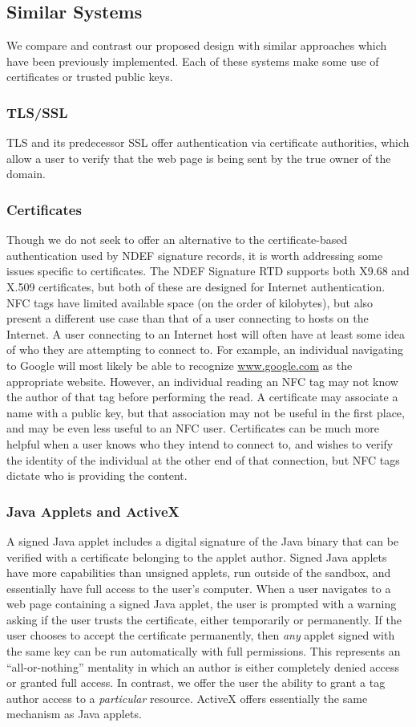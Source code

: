 \documentclass[12pt]{article}
\begin{document}
\subsection{Similar Systems}
We compare and contrast our proposed design with similar approaches which have been previously implemented.
Each of these systems make some use of certificates or trusted public keys.

\subsubsection{TLS/SSL}
TLS and its predecessor SSL offer authentication via certificate authorities, which allow a user to verify that the web page is being sent by the true owner of the domain.
\subsubsection{Certificates}
Though we do not seek to offer an alternative to the certificate-based authentication used by NDEF signature records, it is worth addressing some issues specific to certificates.
The NDEF Signature RTD supports both X9.68 and X.509 certificates, but both of these are designed for Internet authentication.
NFC tags have limited available space (on the order of kilobytes), but also present a different use case than that of a user connecting to hosts on the Internet.
A user connecting to an Internet host will often have at least some idea of who they are attempting to connect to.
For example, an individual navigating to Google will most likely be able to recognize \url{www.google.com} as the appropriate website.
However, an individual reading an NFC tag may not know the author of that tag before performing the read.
A certificate may associate a name with a public key, but that association may not be useful in the first place\cite{ellison2000}, and may be even less useful to an NFC user.
Certificates can be much more helpful when a user knows who they intend to connect to, and wishes to verify the identity of the individual at the other end of that connection, but NFC tags dictate who is providing the content.

\subsubsection{Java Applets and ActiveX}
A signed Java applet includes a digital signature of the Java binary that can be verified with a certificate belonging to the applet author.
Signed Java applets have more capabilities than unsigned applets, run outside of the sandbox, and essentially have full access to the user's computer.
When a user navigates to a web page containing a signed Java applet, the user is prompted with a warning asking if the user trusts the certificate, either temporarily or permanently.
If the user chooses to accept the certificate permanently, then \textit{any} applet signed with the same key can be run automatically with full permissions.
This represents an ``all-or-nothing'' mentality in which an author is either completely denied access or granted full access.
In contrast, we offer the user the ability to grant a tag author access to a \textit{particular} resource.
ActiveX offers essentially the same mechanism as Java applets.
\end{document}
